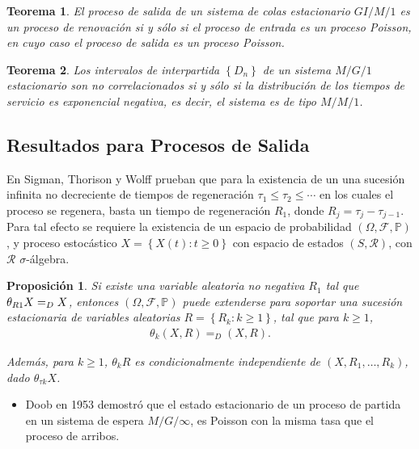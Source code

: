 \documentclass{article}
\newtheorem{Teo}{Teorema}[section]
\newtheorem{Prop}{Proposición}[section]
\newcommand{\prob}{\mathbb{P}}
\numberwithin{equation}{section}
\begin{document}
{\begin{itemize}
\begin{Teo}
El proceso de salida de un sistema de colas estacionario $GI/M/1$ es un proceso de renovaci\'on si y s\'olo si el proceso de entrada es un proceso Poisson, en cuyo caso el proceso de salida es un proceso Poisson.
\end{Teo}


\begin{Teo}
Los intervalos de interpartida $\left\{D_{n}\right\}$ de un sistema $M/G/1$ estacionario son no correlacionados si y s\'olo si la distribuci\'on de los tiempos de servicio es exponencial negativa, es decir, el sistema es de tipo  $M/M/1$.

\end{Teo}



\end{itemize}


\subsection{Resultados para Procesos de Salida}

En Sigman, Thorison y Wolff \cite{Sigman2} prueban que para la existencia de un una sucesi\'on infinita no decreciente de tiempos de regeneraci\'on $\tau_{1}\leq\tau_{2}\leq\cdots$ en los cuales el proceso se regenera, basta un tiempo de regeneraci\'on $R_{1}$, donde $R_{j}=\tau_{j}-\tau_{j-1}$. Para tal efecto se requiere la existencia de un espacio de probabilidad $\left(\Omega,\mathcal{F},\prob\right)$, y proceso estoc\'astico $\textit{X}=\left\{X\left(t\right):t\geq0\right\}$ con espacio de estados $\left(S,\mathcal{R}\right)$, con $\mathcal{R}$ $\sigma$-\'algebra.

\begin{Prop}
Si existe una variable aleatoria no negativa $R_{1}$ tal que $\theta_{R\footnotesize{1}}X=_{D}X$, entonces $\left(\Omega,\mathcal{F},\prob\right)$ puede extenderse para soportar una sucesi\'on estacionaria de variables aleatorias $R=\left\{R_{k}:k\geq1\right\}$, tal que para $k\geq1$,
\begin{eqnarray*}
\theta_{k}\left(X,R\right)=_{D}\left(X,R\right).
\end{eqnarray*}

Adem\'as, para $k\geq1$, $\theta_{k}R$ es condicionalmente independiente de $\left(X,R_{1},\ldots,R_{k}\right)$, dado $\theta_{\tau k}X$.

\end{Prop}


\begin{itemize}
\item Doob en 1953 demostr\'o que el estado estacionario de un proceso de partida en un sistema de espera $M/G/\infty$, es Poisson con la misma tasa que el proceso de arribos.


\end{itemize}}
\end{document}

